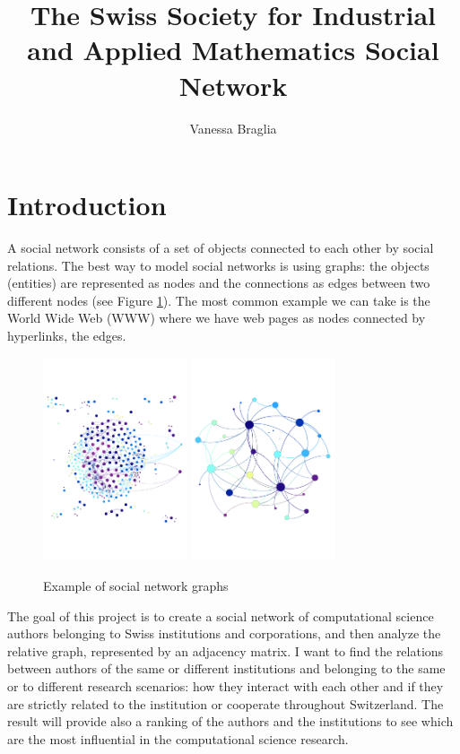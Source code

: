\documentclass[]{usiinfbachelorproject}
\author{Vanessa Braglia}
\title{The Swiss Society for Industrial and Applied Mathematics Social Network}
\begin{document}
\maketitle
\newpage
\tableofcontents
\newpage

\section{Introduction} \label{sec:intro} 

A social network consists of a set of objects connected to each other by social relations. The best way to model social networks is using graphs: the objects (entities) are represented as nodes and the connections as edges between two different nodes (see Figure \ref{fig:socialnetwork}). The most common example we can take is the World Wide Web (WWW) where we have web pages as nodes connected by hyperlinks, the edges.

\begin{figure}[ht]
	\centering
	\includegraphics[height=6cm]{img/graph_auth.pdf}
	\qquad\qquad
	\includegraphics[height=6cm]{img/graph_uni.pdf}
	\caption{Example of social network graphs}
	\label{fig:socialnetwork}
\end{figure}

The goal of this project is to create a social network of computational science authors belonging to Swiss institutions and corporations, and then analyze the relative graph, represented by an adjacency matrix. I want to find the relations between authors of the same or different institutions and belonging to the same or to different research scenarios: how they interact with each other and if they are strictly related to the institution or cooperate throughout Switzerland. The result will provide also a ranking of the authors and the institutions to see which are the most influential in the computational science research.
\end{document}
